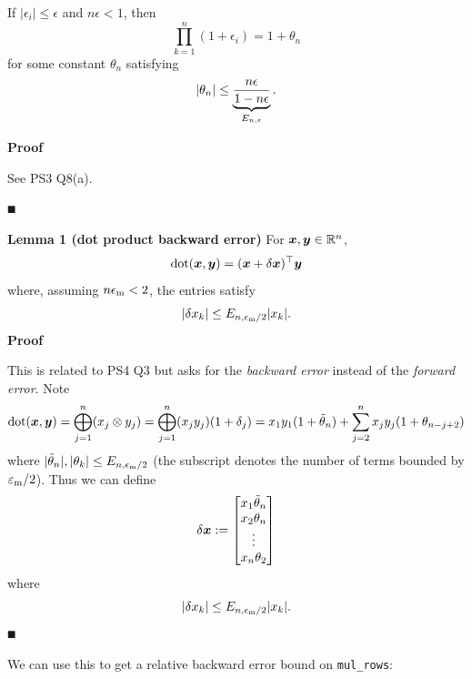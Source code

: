 \begin{proposition} If $|\ensuremath{\epsilon}_i| \ensuremath{\leq} \ensuremath{\epsilon}$ and $n \ensuremath{\epsilon} < 1$, then
\[
\prod_{k=1}^n (1+\ensuremath{\epsilon}_i) = 1+\ensuremath{\theta}_n
\]
for some constant $\ensuremath{\theta}_n$ satisfying
\[
|\ensuremath{\theta}_n| \ensuremath{\leq} \underbrace{n \ensuremath{\epsilon} \over 1-n\ensuremath{\epsilon}}_{E_{n,\ensuremath{\epsilon}}}.
\]
\end{proposition}
\textbf{Proof}

See PS3 Q8(a).

\ensuremath{\QED}

\textbf{Lemma 1 (dot product backward error)} For $\bm{{\mbox{\boldmath$x$\unboldmath}}}, \bm{{\mbox{\boldmath$y$\unboldmath}}} \in {\mathbb R}^n$,
\[
{\rm dot}(\bm{{\mbox{\boldmath$x$\unboldmath}}}, \bm{{\mbox{\boldmath$y$\unboldmath}}}) = (\bm{{\mbox{\boldmath$x$\unboldmath}}} + \delta\bm{{\mbox{\boldmath$x$\unboldmath}}})^\top \bm{{\mbox{\boldmath$y$\unboldmath}}}
\]
where, assuming $n \ensuremath{\epsilon}_{\rm m} < 2$, the entries satisfy
\[
|\ensuremath{\delta}x_k| \ensuremath{\leq}  E_{n,\ensuremath{\epsilon}_{\rm m}/2} |x_k |.
\]
\textbf{Proof}

This is related to PS4 Q3 but asks for the \emph{backward error} instead of the \emph{forward error}. Note
\[
{\rm dot}(\bm{{\mbox{\boldmath$x$\unboldmath}}}, \bm{{\mbox{\boldmath$y$\unboldmath}}}) = \bigoplus_{j=1}^n (x_j \otimes y_j) = \bigoplus_{j=1}^n (x_j  y_j) (1 + \delta_j)
= x_1 y_1 (1 + \tilde{\theta}_{n}) +   \sum_{j=2}^n x_j y_j (1 + \theta_{n-j+2})
\]
where $|\tilde{\theta}_n|, |\ensuremath{\theta}_k| \ensuremath{\leq} E_{n,\ensuremath{\epsilon}_{\rm m}/2}$ (the subscript denotes the number of terms bounded by $\ensuremath{\varepsilon}_{\rm m}/2$). Thus we can define
\[
\delta\bm{{\mbox{\boldmath$x$\unboldmath}}}  := \begin{bmatrix}
x_1 \tilde{\theta}_n \\
x_2 \theta_n \\
\vdots \\
x_n \theta_2
\end{bmatrix}
\]
where
\[
| \ensuremath{\delta}x_k | \ensuremath{\leq}  E_{n,\ensuremath{\epsilon}_{\rm m}/2} | x_k |.
\]
\ensuremath{\QED}

We can use this to get a relative backward error bound on \texttt{mul\_rows}:


